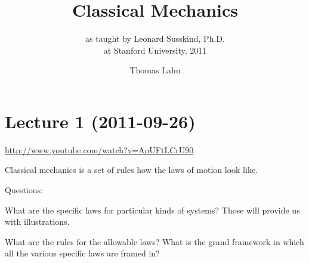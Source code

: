 \documentclass[pagesize,headsepline,10pt,parskip=half]{scrreprt}
\begin{document}

  \begin{titlepage}
    \title{Classical Mechanics}
    \subtitle{as taught by Leonard\xspace Susskind,
    Ph.D.\xspace \\
      at Stanford University, 2011}
    \author{Thomas Lahn}
    \maketitle
  \end{titlepage}

  \clearpage
  \begin{spacing}{1}
    \tableofcontents
    \thispagestyle{empty}
  \end{spacing}


  \clearpage
  \chapter{Lecture 1 (2011-09-26)}
    \url{http://www.youtube.com/watch?v=ApUFtLCrU90}

    Classical mechanics is a set of rules how the laws of motion
    look like.

    Questions:
    \begin{compactitem}
      \item What are the specific laws for particular kinds of
      systems? Those will provide us with illustrations.
      \item What are the rules for the allowable laws?  What is the
      grand framework in which all the various specific laws are
      framed in?
    \end{compactitem}
\end{document}
